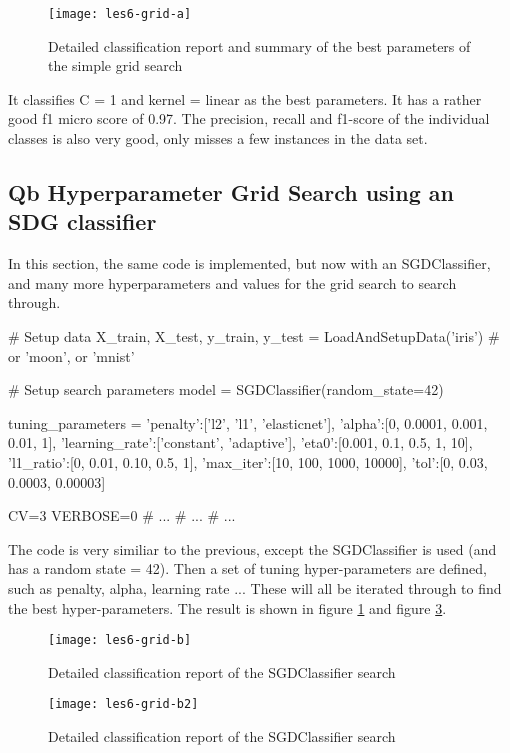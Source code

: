 \documentclass{article}
\begin{document}
\begin{figure}[H]
  \centering
    \texttt{[image: les6-grid-a]}
    \caption{Detailed classification report and summary of the best parameters of the simple grid search}
    \label{fig:les6-grid-a}
\end{figure}

It classifies C =  1 and kernel = linear as the best parameters. It has a rather good f1 micro score of 0.97. The precision, recall and f1-score of the individual classes is also very good, only misses a few instances in the data set. 

\subsection{Qb Hyperparameter Grid Search using an SDG classifier}
In this section, the same code is implemented, but now with an SGDClassifier, and many more hyperparameters and values for the grid search to search through.

\begin{pyminted}

# Setup data
X_train, X_test, y_train, y_test = LoadAndSetupData('iris') # or 'moon', or 'mnist'

# Setup search parameters
model = SGDClassifier(random_state=42)

tuning_parameters = {
    'penalty':['l2', 'l1', 'elasticnet'],
    'alpha':[0, 0.0001, 0.001, 0.01, 1],
    'learning_rate':['constant', 'adaptive'],
    'eta0':[0.001, 0.1, 0.5, 1, 10],
    'l1_ratio':[0, 0.01, 0.10, 0.5, 1],
    'max_iter':[10, 100, 1000, 10000],
    'tol':[0, 0.03, 0.0003, 0.00003]
}

CV=3
VERBOSE=0
# ...
# ...
# ...
\end{pyminted}

The code is very similiar to the previous, except the SGDClassifier is used (and has a random state = 42). Then a set of tuning hyper-parameters are defined, such as penalty, alpha, learning rate ... These will all be iterated through to find the best hyper-parameters. The result is shown in figure \ref{fig:les6-grid-a} and figure \ref{fig:les6-grid-b2}.

\begin{figure}[H]
  \centering
    \texttt{[image: les6-grid-b]}
    \caption{Detailed classification report of the SGDClassifier search}
    \label{fig:les6-grid-b}
\end{figure}

\begin{figure}[H]
  \centering
    \texttt{[image: les6-grid-b2]}
    \caption{Detailed classification report of the SGDClassifier search}
    \label{fig:les6-grid-b2}
\end{figure}
\end{document}
